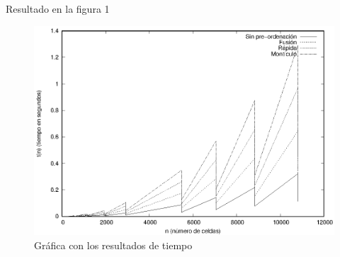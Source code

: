 Resultado en la figura 1
\begin{figure}
\centering
\includegraphics[width=0.7\linewidth]{./graphic.eps}
\caption{Gráfica con los resultados de tiempo}
\label{fig:defenseValueCellsHead}
\end{figure}
